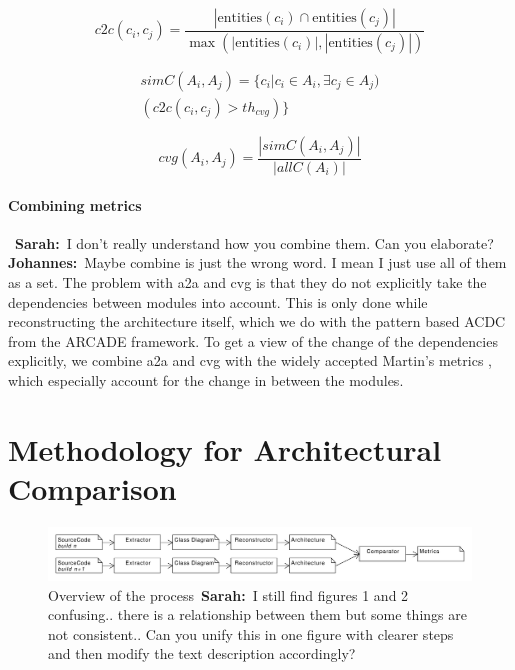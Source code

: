 \documentclass[sigplan, anonymous, review]{acmart}
\newcommand{\sn}[1]{{\color{blue}\textbf{Sarah:}~#1}}
\newcommand{\jk}[1]{{\color{violet}\textbf{Johannes:}~#1}}
\begin{document}
\begin{equation} \label{eq:c2c}
c2c(c_i, c_j) = \frac{|\text{entities}(c_i) \cap \text{entities}(c_j)|}{\max(|\text{entities}(c_i)|, |\text{entities}(c_j)|)}
\end{equation}

\begin{equation} \label{eq:simC}
\begin{split}
simC(A_i, A_j) = \{c_i | c_i \in A_i, \exists c_j \in A_j) \\ 
(c2c(c_i, c_j) > th_{cvg})\}
\end{split}
\end{equation}

\begin{equation} \label{eq:cvg}
cvg(A_i, A_j) = \frac{|simC(A_i, A_j)|}{|allC(A_i)|}
\end{equation}

\paragraph{Combining metrics} 
~\sn{I don't really understand how you combine them. Can you elaborate?} \jk{Maybe combine is just the wrong word. I mean I just use all of them as a set. }
The problem with a2a and cvg is that they do not explicitly take the dependencies between modules into account. This is only done while reconstructing the architecture itself, which we do with the pattern based ACDC from the ARCADE framework. 
To get a view of the change of the dependencies explicitly, we combine a2a and cvg with the widely accepted Martin's metrics \cite{Val-MartinsMet}, which especially account for the change in between the modules. 

\section{Methodology for Architectural Comparison}

\begin{figure}[!t]
	\centering
	\includegraphics[width=7in]{assets/overview.pdf}
	\caption{Overview of the process~\sn{I still find figures 1 and 2 confusing.. there is a relationship between them but some things are not consistent.. Can you unify this in one figure with clearer steps and then modify the text description accordingly?}}
	\label{overview}
\end{figure}
\end{document}
